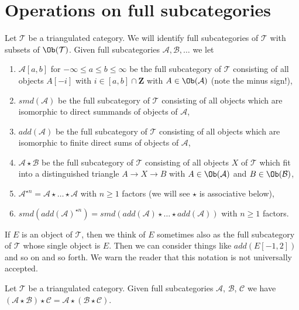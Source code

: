 \section{Operations on full subcategories}
\label{section-operate-on-full}

\noindent
Let $\mathcal{T}$ be a triangulated category. We will identify full
subcategories of $\mathcal{T}$ with subsets of $\Ob(\mathcal{T})$.
Given full subcategories $\mathcal{A}, \mathcal{B}, \ldots$ we let
\begin{enumerate}
\item $\mathcal{A}[a, b]$ for $-\infty \leq a \leq b \leq \infty$
be the full subcategory of $\mathcal{T}$ consisting of all objects
$A[-i]$ with $i \in [a, b] \cap \mathbf{Z}$
with $A \in \Ob(\mathcal{A})$ (note the minus sign!),
\item $smd(\mathcal{A})$ be the full subcategory of $\mathcal{T}$
consisting of all objects which are isomorphic to direct summands of objects
of $\mathcal{A}$,
\item $add(\mathcal{A})$ be the full subcategory of $\mathcal{T}$
consisting of all objects which are isomorphic to finite direct sums of objects
of $\mathcal{A}$,
\item $\mathcal{A} \star \mathcal{B}$ be the full subcategory of $\mathcal{T}$
consisting of all objects $X$ of $\mathcal{T}$ which fit into a distinguished
triangle $A \to X \to B$ with $A \in \Ob(\mathcal{A})$ and
$B \in \Ob(\mathcal{B})$,
\item $\mathcal{A}^{\star n} = \mathcal{A} \star \ldots \star \mathcal{A}$
with $n \geq 1$ factors (we will see $\star$ is associative below),
\item $smd(add(\mathcal{A})^{\star n}) =
smd(add(\mathcal{A}) \star \ldots \star add(\mathcal{A}))$
with $n \geq 1$ factors.
\end{enumerate}
If $E$ is an object of $\mathcal{T}$, then we think of $E$ sometimes
also as the full subcategory of $\mathcal{T}$ whose single object is $E$.
Then we can consider things like $add(E[-1, 2])$ and so on and so forth.
We warn the reader that this notation is not universally accepted.

\begin{lemma}
\label{lemma-associativity-star}
Let $\mathcal{T}$ be a triangulated category.
Given full subcategories $\mathcal{A}$, $\mathcal{B}$, $\mathcal{C}$
we have $(\mathcal{A} \star \mathcal{B}) \star \mathcal{C} =
\mathcal{A} \star (\mathcal{B} \star \mathcal{C})$.
\end{lemma}

